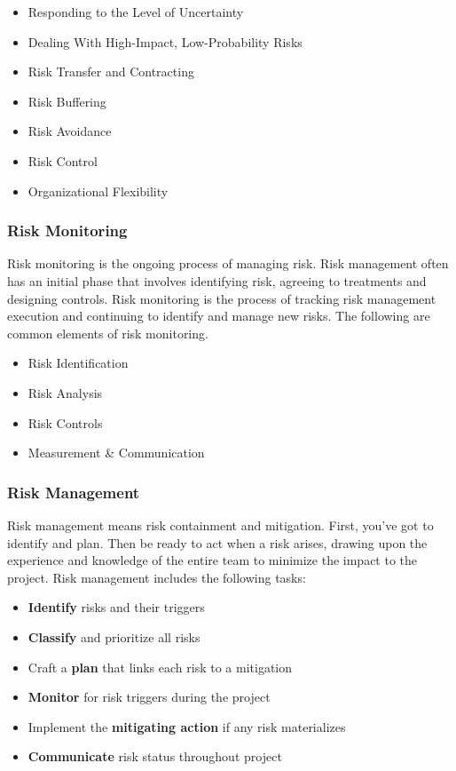 \documentclass[oneside,a4paper,12pt]{book}
\begin{document}
\begin{itemize}
\begin{itemize}
    \item Responding to the Level of Uncertainty
    \item Dealing With High-Impact, Low-Probability Risks
    \item Risk Transfer and Contracting
    \item Risk Buffering
    \item Risk Avoidance
    \item Risk Control
    \item Organizational Flexibility
\end{itemize}
\end{itemize}
\subsubsection{Risk Monitoring}
Risk monitoring is the ongoing process of managing risk. Risk management often has an initial phase that involves identifying risk, agreeing to treatments and designing controls. Risk monitoring is the process of tracking risk management execution and continuing to identify and manage new risks. The following are common elements of risk monitoring.
\begin{itemize}
    \item Risk Identification
    \item Risk Analysis
    \item Risk Controls
    \item Measurement & Communication
\end{itemize}
\subsubsection{Risk Management}
Risk management means risk containment and mitigation. First, you’ve got to identify and plan. Then be ready to act when a risk arises, drawing upon the experience and knowledge of the entire team to minimize the impact to the project. 
Risk management includes the following tasks:
\begin{itemize}
    \item \textbf{Identify} risks and their triggers
    \item \textbf{Classify} and prioritize all risks
    \item Craft a \textbf{plan} that links each risk to a mitigation
    \item \textbf{Monitor} for risk triggers during the project
    \item Implement the \textbf{mitigating action} if any risk materializes
    \item \textbf{Communicate} risk status throughout project
\end{itemize}
\end{document}
